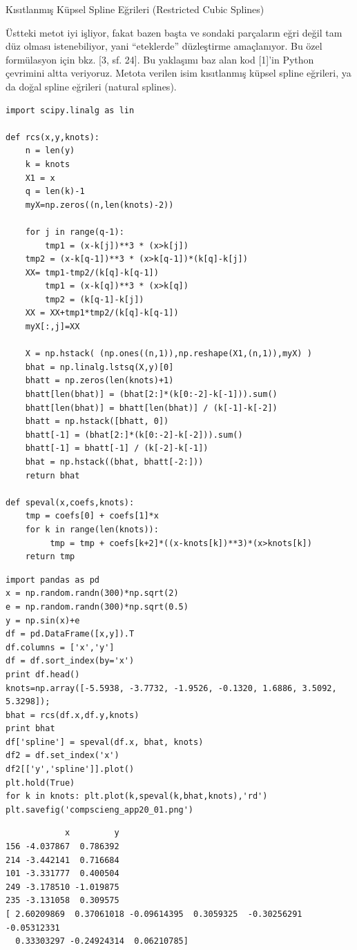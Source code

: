 \documentclass[12pt,fleqn]{article}\usepackage{../../common}
\begin{document}
Kısıtlanmış Küpsel Spline Eğrileri (Restricted Cubic Splines)

Üstteki metot iyi işliyor, fakat bazen başta ve sondaki parçaların eğri
değil tam düz olması istenebiliyor, yani ``eteklerde'' düzleştirme
amaçlanıyor. Bu özel formülasyon için bkz. [3, sf. 24]. Bu yaklaşımı baz
alan kod [1]'in Python çevrimini altta veriyoruz. Metota verilen isim
kısıtlanmış küpsel spline eğrileri, ya da doğal spline eğrileri (natural
splines). 

\begin{verbatim}
import scipy.linalg as lin

def rcs(x,y,knots):
    n = len(y)
    k = knots
    X1 = x
    q = len(k)-1
    myX=np.zeros((n,len(knots)-2))

    for j in range(q-1):
    	tmp1 = (x-k[j])**3 * (x>k[j])
	tmp2 = (x-k[q-1])**3 * (x>k[q-1])*(k[q]-k[j])
	XX= tmp1-tmp2/(k[q]-k[q-1])
        tmp1 = (x-k[q])**3 * (x>k[q])
        tmp2 = (k[q-1]-k[j])
	XX = XX+tmp1*tmp2/(k[q]-k[q-1])
	myX[:,j]=XX

    X = np.hstack( (np.ones((n,1)),np.reshape(X1,(n,1)),myX) )
    bhat = np.linalg.lstsq(X,y)[0]
    bhatt = np.zeros(len(knots)+1)
    bhatt[len(bhat)] = (bhat[2:]*(k[0:-2]-k[-1])).sum()
    bhatt[len(bhat)] = bhatt[len(bhat)] / (k[-1]-k[-2])
    bhatt = np.hstack([bhatt, 0])    
    bhatt[-1] = (bhat[2:]*(k[0:-2]-k[-2])).sum()
    bhatt[-1] = bhatt[-1] / (k[-2]-k[-1])
    bhat = np.hstack((bhat, bhatt[-2:]))
    return bhat

def speval(x,coefs,knots):
    tmp = coefs[0] + coefs[1]*x 
    for k in range(len(knots)): 
         tmp = tmp + coefs[k+2]*((x-knots[k])**3)*(x>knots[k])
    return tmp
\end{verbatim}


\begin{verbatim}
import pandas as pd
x = np.random.randn(300)*np.sqrt(2)
e = np.random.randn(300)*np.sqrt(0.5)
y = np.sin(x)+e
df = pd.DataFrame([x,y]).T
df.columns = ['x','y']
df = df.sort_index(by='x')
print df.head()
knots=np.array([-5.5938, -3.7732, -1.9526, -0.1320, 1.6886, 3.5092, 5.3298]);
bhat = rcs(df.x,df.y,knots)
print bhat
df['spline'] = speval(df.x, bhat, knots)
df2 = df.set_index('x')
df2[['y','spline']].plot()
plt.hold(True)
for k in knots: plt.plot(k,speval(k,bhat,knots),'rd')
plt.savefig('compscieng_app20_01.png')
\end{verbatim}

\begin{verbatim}
            x         y
156 -4.037867  0.786392
214 -3.442141  0.716684
101 -3.331777  0.400504
249 -3.178510 -1.019875
235 -3.131058  0.309575
[ 2.60209869  0.37061018 -0.09614395  0.3059325  -0.30256291 -0.05312331
  0.33303297 -0.24924314  0.06210785]
\end{verbatim}
\end{document}
